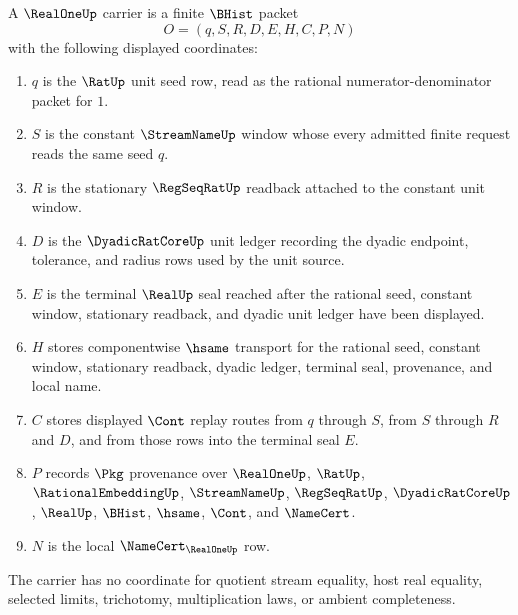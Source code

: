 \begin{definition}
\label{def:real-one-carrier}
A $\RealOneUp$ carrier is a finite $\BHist$ packet
$$
O=(q,S,R,D,E,H,C,P,N)
$$
with the following displayed coordinates:
\begin{enumerate}
\item $q$ is the $\RatUp$ unit seed row, read as the rational numerator-denominator packet for $1$.
\item $S$ is the constant $\StreamNameUp$ window whose every admitted finite request reads the same seed $q$.
\item $R$ is the stationary $\RegSeqRatUp$ readback attached to the constant unit window.
\item $D$ is the $\DyadicRatCoreUp$ unit ledger recording the dyadic endpoint, tolerance, and radius rows used by the unit source.
\item $E$ is the terminal $\RealUp$ seal reached after the rational seed, constant window, stationary readback, and dyadic unit ledger have been displayed.
\item $H$ stores componentwise $\hsame$ transport for the rational seed, constant window, stationary readback, dyadic ledger, terminal seal, provenance, and local name.
\item $C$ stores displayed $\Cont$ replay routes from $q$ through $S$, from $S$ through $R$ and $D$, and from those rows into the terminal seal $E$.
\item $P$ records $\Pkg$ provenance over $\RealOneUp$, $\RatUp$, $\RationalEmbeddingUp$, $\StreamNameUp$, $\RegSeqRatUp$, $\DyadicRatCoreUp$, $\RealUp$, $\BHist$, $\hsame$, $\Cont$, and $\NameCert$.
\item $N$ is the local $\NameCert_{\RealOneUp}$ row.
\end{enumerate}
The carrier has no coordinate for quotient stream equality, host real equality, selected limits, trichotomy, multiplication laws, or ambient completeness.
\end{definition}

